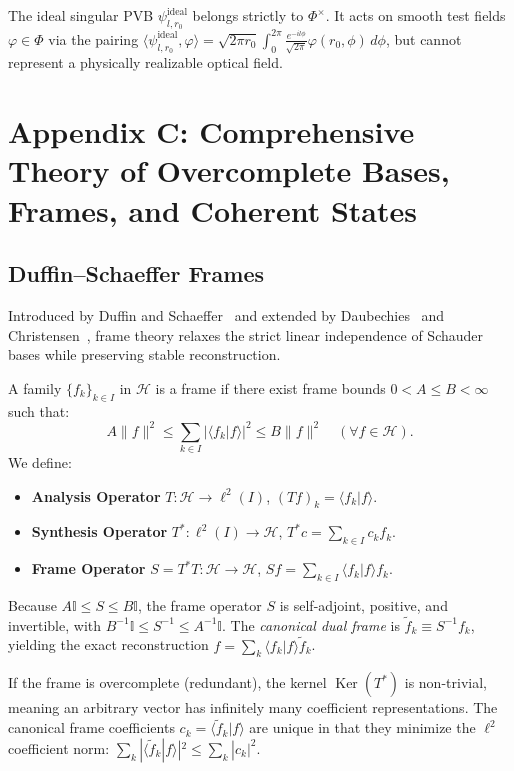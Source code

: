 \documentclass[11pt,a4paper]{article}
\begin{document}
The ideal singular PVB $\psi_{l, r_0}^{\text{ideal}}$ belongs strictly to $\Phi^\times$. It acts on smooth test fields $\varphi \in \Phi$ via the pairing $\langle \psi_{l, r_0}^{\text{ideal}}, \varphi \rangle = \sqrt{2\pi r_0} \int_0^{2\pi} \frac{e^{-i l \phi}}{\sqrt{2\pi}} \varphi(r_0, \phi) \, d\phi$, but cannot represent a physically realizable optical field.

\section{Appendix C: Comprehensive Theory of Overcomplete Bases, Frames, and Coherent States}
\label{app:frames}

\subsection{Duffin--Schaeffer Frames}

Introduced by Duffin and Schaeffer~\cite{Duffin1952} and extended by Daubechies~\cite{Daubechies1990} and Christensen~\cite{Christensen2016}, frame theory relaxes the strict linear independence of Schauder bases while preserving stable reconstruction.

A family $\{f_k\}_{k \in I}$ in $\mathcal{H}$ is a frame if there exist frame bounds $0 < A \le B < \infty$ such that:
\begin{equation}
A \|f\|^2 \le \sum_{k \in I} |\langle f_k | f \rangle|^2 \le B \|f\|^2 \quad (\forall f \in \mathcal{H}).
\end{equation}
We define:
\begin{itemize}
    \item \textbf{Analysis Operator} $T: \mathcal{H} \to \ell^2(I)$, $(T f)_k = \langle f_k | f \rangle$.
    \item \textbf{Synthesis Operator} $T^*: \ell^2(I) \to \mathcal{H}$, $T^* c = \sum_{k \in I} c_k f_k$.
    \item \textbf{Frame Operator} $S = T^* T: \mathcal{H} \to \mathcal{H}$, $S f = \sum_{k \in I} \langle f_k | f \rangle f_k$.
\end{itemize}
Because $A \mathbb{I} \le S \le B \mathbb{I}$, the frame operator $S$ is self-adjoint, positive, and invertible, with $B^{-1} \mathbb{I} \le S^{-1} \le A^{-1} \mathbb{I}$. The \emph{canonical dual frame} is $\widetilde{f}_k \equiv S^{-1} f_k$, yielding the exact reconstruction $f = \sum_k \langle f_k | f \rangle \widetilde{f}_k$.

If the frame is overcomplete (redundant), the kernel $\operatorname{Ker}(T^*)$ is non-trivial, meaning an arbitrary vector has infinitely many coefficient representations. The canonical frame coefficients $c_k = \langle \widetilde{f}_k | f \rangle$ are unique in that they minimize the $\ell^2$ coefficient norm: $\sum_k |\langle \widetilde{f}_k | f \rangle|^2 \le \sum_k |c_k|^2$.
\end{document}
